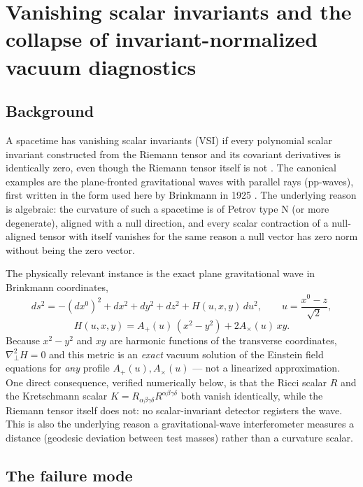 \documentclass[aps,onecolumn,10pt,nofootinbib]{revtex4-2}
\begin{document}
\section{Vanishing scalar invariants and the collapse of invariant-normalized vacuum diagnostics}
\label{sec:vsi}

\subsection{Background}

A spacetime has vanishing scalar invariants (VSI) if every polynomial
scalar invariant constructed from the Riemann tensor and its covariant
derivatives is identically zero, even though the Riemann tensor itself is
not \cite{Pravda2002}. The canonical examples are the plane-fronted
gravitational waves with parallel rays (pp-waves), first written in the
form used here by Brinkmann in 1925 \cite{Brinkmann1925}. The underlying
reason is algebraic: the curvature of such a spacetime is of Petrov type N
(or more degenerate), aligned with a null direction, and every scalar
contraction of a null-aligned tensor with itself vanishes for the same
reason a null vector has zero norm without being the zero vector.

The physically relevant instance is the exact plane gravitational wave in
Brinkmann coordinates,
\begin{equation}
  ds^2 = -(dx^0)^2 + dx^2 + dy^2 + dz^2 + H(u,x,y)\,du^2,
  \qquad u = \frac{x^0 - z}{\sqrt{2}},
\end{equation}
\begin{equation}
  H(u,x,y) = A_+(u)\,(x^2 - y^2) + 2A_\times(u)\,xy.
\end{equation}
Because $x^2 - y^2$ and $xy$ are harmonic functions of the transverse
coordinates, $\nabla_\perp^2 H = 0$ and this metric is an \emph{exact}
vacuum solution of the Einstein field equations for \emph{any} profile
$A_+(u), A_\times(u)$ — not a linearized approximation. One direct
consequence, verified numerically below, is that the Ricci scalar $R$ and
the Kretschmann scalar $K = R_{\alpha\beta\gamma\delta}R^{\alpha\beta\gamma\delta}$
both vanish identically, while the Riemann tensor itself does not: no
scalar-invariant detector registers the wave. This is also the underlying
reason a gravitational-wave interferometer measures a distance (geodesic
deviation between test masses) rather than a curvature scalar.

\subsection{The failure mode}
\label{sec:vsi-failure}
\end{document}

